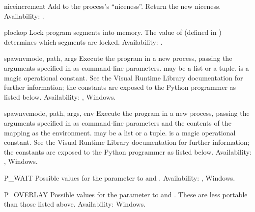 \begin{funcdesc}{nice}{increment}
Add  to the process's ``niceness''.  Return the new
niceness.
Availability: \UNIX{}.
\end{funcdesc}

\begin{funcdesc}{plock}{op}
Lock program segments into memory.  The value of 
(defined in ) determines which segments are locked.
Availability: \UNIX{}.
\end{funcdesc}

\begin{funcdesc}{spawnv}{mode, path, args}
Execute the program  in a new process, passing the arguments 
specified in  as command-line parameters.   may be 
a list or a tuple.   is a magic operational constant.  See
the Visual \Cpp{} Runtime Library documentation for further
information; the constants are exposed to the Python programmer as
listed below.
Availability: \UNIX{}, Windows.
\end{funcdesc}

\begin{funcdesc}{spawnve}{mode, path, args, env}
Execute the program  in a new process, passing the arguments 
specified in  as command-line parameters and the contents of 
the mapping  as the environment.   may be a list or
a tuple.   is a magic operational constant.  See the Visual
\Cpp{} Runtime Library documentation for further information; the
constants are exposed to the Python programmer as listed below.
Availability: \UNIX{}, Windows.
\end{funcdesc}

\begin{datadesc}{P_WAIT}
Possible values for the  parameter to 
and .
Availability: \UNIX{}, Windows.
\end{datadesc}

\begin{datadesc}{P_OVERLAY}
Possible values for the  parameter to 
and .  These are less portable than those listed
above.
Availability: Windows.
\end{datadesc}

